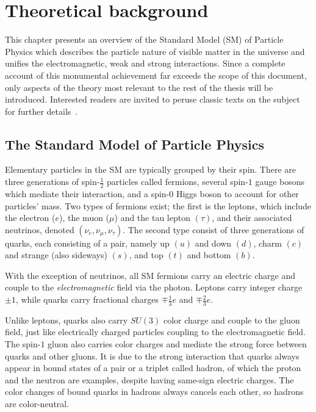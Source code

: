 \chapter{Theoretical background}

This chapter presents an overview of the Standard Model (SM) of Particle Physics which describes the particle nature of visible matter in the universe and unifies the electromagnetic, weak and strong interactions. 
Since a complete account of this monumental achievement far exceeds the scope of this document, only aspects of the theory most relevant to the rest of the thesis will be introduced. 
Interested readers are invited to peruse classic texts on the subject for further details~\cite{Peskin_2018, Halzen_Martin_2016, Schwartz_2014}.

\section{The Standard Model of Particle Physics}

Elementary particles in the SM are typically grouped by their spin. 
There are three generations of spin-$\frac{1}{2}$ particles called fermions, several spin-$1$ gauge bosons which mediate their interaction, and a spin-$0$ Higgs boson to account for other particles' mass. 
Two types of fermions exist; the first is the leptons, which include the electron ($e$), the muon ($\mu$) and the tau lepton $(\tau)$, and their associated neutrinos, denoted $(\nu_e, \nu_{\mu}, \nu_{\tau})$. 
The second type consist of three generations of quarks, each consisting of a pair, namely up $(u)$ and down $(d)$, charm $(c)$ and strange (also sideways) $(s)$, and top $(t)$ and bottom $(b)$. 

With the exception of neutrinos, all SM fermions carry an electric charge and couple to the \textit{electromagnetic} field via the photon. Leptons carry integer charge $\pm1$, while quarks carry fractional charges $\mp\frac{1}{3}e$ and $\mp\frac{2}{3}e$. 

Unlike leptons, quarks also carry $SU(3)$ color charge and couple to the gluon field, just like electrically charged particles coupling to the electromagnetic field. 
The spin-$1$ gluon also carries color charges and mediate the strong force between quarks and other gluons. 
It is due to the strong interaction that quarks always appear in bound states of a pair or a triplet called hadron, of which the proton and the neutron are examples, despite having same-sign electric charges. 
The color changes of bound quarks in hadrons always cancels each other, so hadrons are color-neutral. 

